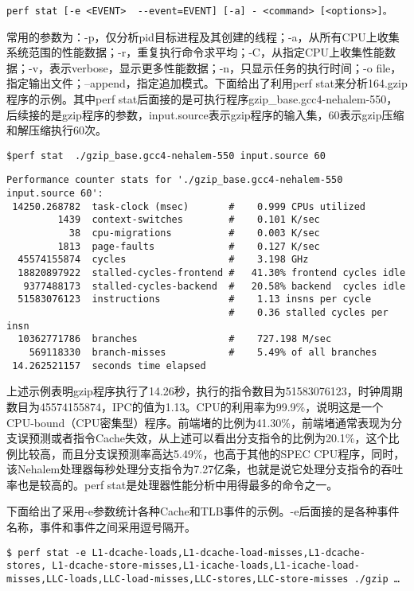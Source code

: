 \documentclass[]{ctexbook}
\begin{document}
\texttt{perf\ stat\ {[}-e\ \textless{}EVENT\textgreater{}\ \textbar{}\ -\/-event=EVENT{]}\ {[}-a{]}\ -\ \textless{}command\textgreater{}\ {[}\textless{}options\textgreater{}{]}。}

常用的参数为：-p，仅分析pid目标进程及其创建的线程；-a，从所有CPU上收集系统范围的性能数据；-r，重复执行命令求平均；-C，从指定CPU上收集性能数据；-v，表示verbose，显示更多性能数据；-n，只显示任务的执行时间；-o file，指定输出文件；--append，指定追加模式。下面给出了利用perf stat来分析164.gzip程序的示例。其中perf stat后面接的是可执行程序gzip\_base.gcc4-nehalem-550，后续接的是gzip程序的参数，input.source表示gzip程序的输入集，60表示gzip压缩和解压缩执行60次。

\texttt{\$perf\ stat\ \ ./gzip\_base.gcc4-nehalem-550\ input.source\ 60}

\begin{verbatim}
Performance counter stats for './gzip_base.gcc4-nehalem-550 input.source 60':
 14250.268782  task-clock (msec)       #    0.999 CPUs utilized          
         1439  context-switches        #    0.101 K/sec                  
           38  cpu-migrations          #    0.003 K/sec                  
         1813  page-faults             #    0.127 K/sec                  
  45574155874  cycles                  #    3.198 GHz                   
  18820897922  stalled-cycles-frontend #   41.30% frontend cycles idle   
   9377488173  stalled-cycles-backend  #   20.58% backend  cycles idle   
  51583076123  instructions            #    1.13 insns per cycle        
                                       #    0.36 stalled cycles per insn
  10362771786  branches                #    727.198 M/sec                  
    569118330  branch-misses           #    5.49% of all branches       
 14.262521157  seconds time elapsed
\end{verbatim}

上述示例表明gzip程序执行了14.26秒，执行的指令数目为51583076123，时钟周期数目为45574155874，IPC的值为1.13。CPU的利用率为99.9\%，说明这是一个CPU-bound（CPU密集型）程序。前端堵的比例为41.30\%，前端堵通常表现为分支误预测或者指令Cache失效，从上述可以看出分支指令的比例为20.1\%，这个比例比较高，而且分支误预测率高达5.49\%，也高于其他的SPEC CPU程序，同时，该Nehalem处理器每秒处理分支指令为7.27亿条，也就是说它处理分支指令的吞吐率也是较高的。perf stat是处理器性能分析中用得最多的命令之一。

下面给出了采用-e参数统计各种Cache和TLB事件的示例。-e后面接的是各种事件名称，事件和事件之间采用逗号隔开。

\texttt{\$\ perf\ stat\ -e\ L1-dcache-loads,L1-dcache-load-misses,L1-dcache-stores,\ L1-dcache-store-misses,L1-icache-loads,L1-icache-load-misses,LLC-loads,LLC-load-misses,LLC-stores,LLC-store-misses\ ./gzip\ \ldots{}}
\end{document}
